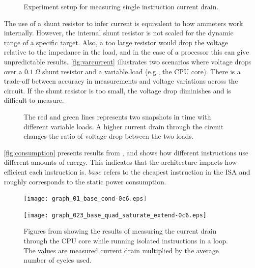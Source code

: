 \begin{figure}[bth]
    \centering
    
    \caption{Experiment setup for measuring single instruction current drain.}
    \label{fig:setup}
\end{figure}

The use of a shunt resistor to infer current is equivalent to how ammeters work
internally. However, the internal shunt resistor is not scaled for the dynamic
range of a specific target. Also, a too large resistor would drop the voltage
relative to the impedance in the load, and in the case of a processor this can
give unpredictable results. \autoref{fig:varcurrent} illustrates two scenarios
where voltage drops over a $0.1~\Omega$ shunt resistor and a variable load
(e.g., the CPU core). There is a trade-off between accuracy in measurements and
voltage variations across the circuit. If the shunt resistor is too small, the
voltage drop diminishes and is difficult to measure.

\begin{figure}[tbh]
    \centering
    
    \caption{The red and green lines represents two snapshots in time with
    different variable loads. A higher current drain through the circuit
    changes the ratio of voltage drop between the two loads.}
    \label{fig:varcurrent}
\end{figure}

\autoref{fig:consumption} presents results from \cite{rundehvatum2013exploring},
and shows how different instructions use different amounts of energy. This
indicates that the architecture impacts how efficient each instruction is.
$base$ refers to the cheapest instruction in the ISA and roughly corresponds to
the static power consumption.

\begin{figure}
    \begin{minipage}[b]{0.48\textwidth}
        \texttt{[image: graph\_01\_base\_cond-0c6.eps]}
        \label{fig:consumptioncond}
    \end{minipage}
    \begin{minipage}[b]{0.52\textwidth}
        \texttt{[image: graph\_023\_base\_quad\_saturate\_extend-0c6.eps]}
        \label{fig:consumptionmulti}
    \end{minipage}
    \caption{Figures from \cite{rundehvatum2013exploring} showing the results of
        measuring the current drain through the CPU core while running isolated
        instructions in a loop. The values are measured current drain multiplied
        by the average number of cycles used.}
    \label{fig:consumption}
\end{figure}


